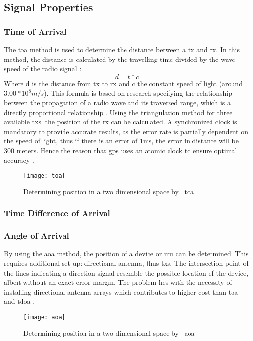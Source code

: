 \subsection{Signal Properties}
\subsubsection{Time of Arrival}
The \acrfull{toa} method is used to determine the distance between a \acrfull{tx} and \acrfull{rx}. In this method, the distance is calculated by the travelling time divided by the wave speed of the radio signal \cite{Loy2018}:
\begin{equation}
d = t * c
\end{equation}
Where d is the distance from \acrshort{tx} to \acrshort{rx} and c the constant speed of light (around $3.00 * 10^8 m/s$). This formula is based on research specifying the relationship between the propagation of a radio wave and its traversed range, which is a directly proportional relationship \cite{S2016}. Using the triangulation method for three available \acrlong{tx}s, the position of the \acrlong{rx} can be calculated. A synchronized clock is mandatory to provide accurate results, as the error rate is partially dependent on the speed of light, thus if there is an error of 1ms, the error in distance will be 300 meters. Hence the reason that \acrfull{gps} uses an atomic clock to ensure optimal accuracy \cite{Jindal}.
\begin{figure}[h!]
\centering
\texttt{[image: toa]}
\caption{Determining position in a two dimensional space by ~\acrlong{toa}~\cite{Jindal}}
\label{fig:toa}
\end{figure}
\subsubsection{Time Difference of Arrival}
\subsubsection{Angle of Arrival}
By using the \acrfull{aoa} method, the position of a device or \acrlong{mu} can be determined. This requires additional set up: directional antenna, thus \acrlong{tx}s. The intersection point of the lines indicating a direction signal resemble the possible location of the device, albeit without an exact error margin. The problem lies with the necessity of installing directional antenna arrays which contributes to higher cost than \acrlong{toa} and \acrlong{tdoa} \cite{Jindal}.
\begin{figure}[h!]
\centering
\texttt{[image: aoa]}
\caption{Determining position in a two dimensional space by ~\acrlong{aoa}~\cite{Jindal}}
\label{fig:aoa}
\end{figure}
